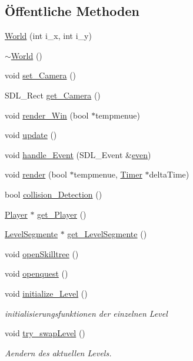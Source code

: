 \subsection*{Öffentliche Methoden}
\begin{DoxyCompactItemize}
\item 
\hyperlink{class_world_a223764f33284a2f1f0bf647ffb210759}{World} (int i\-\_\-x, int i\-\_\-y)
\item 
\hyperlink{class_world_a8c73fba541a5817fff65147ba47cd827}{$\sim$\-World} ()
\item 
void \hyperlink{class_world_a149a22406179d656aea426c32577bed9}{set\-\_\-\-Camera} ()
\item 
S\-D\-L\-\_\-\-Rect \hyperlink{class_world_ae55ead4b6828a5f2b3a6d93e8c947c97}{get\-\_\-\-Camera} ()
\item 
void \hyperlink{class_world_a9164eb25c327d3c1153deb6a6fd89a83}{render\-\_\-\-Win} (bool $\ast$tempmenue)
\item 
void \hyperlink{class_world_aac8c1fde63c06577ffc648aaefdb37f0}{update} ()
\item 
void \hyperlink{class_world_a6e9d1717aae39babd17d801a7de6486d}{handle\-\_\-\-Event} (S\-D\-L\-\_\-\-Event \&\hyperlink{class_world_a4f32e82a26dac5cc9ce72bfe0d596340}{even})
\item 
void \hyperlink{class_world_a15a2d4bb5a4f26400a6c1365d8eb4875}{render} (bool $\ast$tempmenue, \hyperlink{class_timer}{Timer} $\ast$delta\-Time)
\item 
bool \hyperlink{class_world_ae324f881eae678d166eb81321dc8cbab}{collision\-\_\-\-Detection} ()
\item 
\hyperlink{class_player}{Player} $\ast$ \hyperlink{class_world_af0d1ca602664a0a005cf1521b6aee784}{get\-\_\-\-Player} ()
\item 
\hyperlink{class_level_segmente}{Level\-Segmente} $\ast$ \hyperlink{class_world_affdfa76f27683180d8103b297ae6972c}{get\-\_\-\-Level\-Segmente} ()
\item 
void \hyperlink{class_world_aae955513a6b43da75bebbaf0022efcc3}{open\-Skilltree} ()
\item 
void \hyperlink{class_world_a503eb92ca22d62edfba5caaa405b7ff7}{openquest} ()
\item 
void \hyperlink{class_world_a862716ca9282cf7f64522fd819427498}{initialize\-\_\-\-Level} ()
\begin{DoxyCompactList}\small\item\em initialisierungsfunktionen der einzelnen Level \end{DoxyCompactList}\item 
void \hyperlink{class_world_a227f2998664ae3586190752920ee2713}{try\-\_\-swap\-Level} ()
\begin{DoxyCompactList}\small\item\em Aendern des aktuellen Levels. \end{DoxyCompactList}\end{DoxyCompactItemize}
